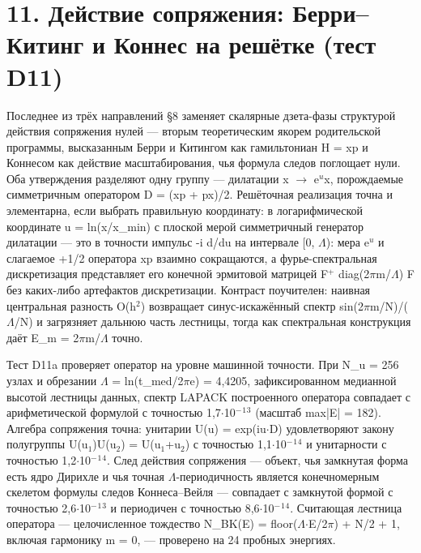 \documentclass[11pt,a4paper]{article}
\begin{document}
\section{11. Действие сопряжения: Берри--Китинг и Коннес на решётке (тест D11)}
Последнее из трёх направлений \S{}8 заменяет скалярные дзета-фазы структурой действия сопряжения нулей --- вторым теоретическим якорем родительской программы, высказанным Берри и Китингом как гамильтониан H = xp и Коннесом как действие масштабирования, чья формула следов поглощает нули. Оба утверждения разделяют одну группу --- дилатации x $\to$ e$^{u}$x, порождаемые симметричным оператором D = (xp + px)/2. Решёточная реализация точна и элементарна, если выбрать правильную координату: в логарифмической координате u = ln(x/x\_\allowbreak{}min) с плоской мерой симметричный генератор дилатации --- это в точности импульс -i d/du на интервале [0, $\Lambda$): мера e$^{u}$ и слагаемое +1/2 оператора xp взаимно сокращаются, а фурье-спектральная дискретизация представляет его конечной эрмитовой матрицей F$^{+}$ diag(2$\pi$m/$\Lambda$) F без каких-либо артефактов дискретизации. Контраст поучителен: наивная центральная разность O(h$^{2}$) возвращает синус-искажённый спектр sin(2$\pi$m/N)/($\Lambda$/N) и загрязняет дальнюю часть лестницы, тогда как спектральная конструкция даёт E\_\allowbreak{}m = 2$\pi$m/$\Lambda$ точно.

Тест D11a проверяет оператор на уровне машинной точности. При N\_\allowbreak{}u = 256 узлах и обрезании $\Lambda$ = ln(t\_\allowbreak{}med/2$\pi$e) = 4,4205, зафиксированном медианной высотой лестницы данных, спектр LAPACK построенного оператора совпадает с арифметической формулой с точностью 1,7$\cdot$10$^{-}$$^{1}$$^{3}$ (масштаб max|E| = 182). Алгебра сопряжения точна: унитарии U(u) = exp(iu$\cdot$D) удовлетворяют закону полугруппы U(u$_{1}$)U(u$_{2}$) = U(u$_{1}$+u$_{2}$) с точностью 1,1$\cdot$10$^{-}$$^{1}$$^{4}$ и унитарности с точностью 1,2$\cdot$10$^{-}$$^{1}$$^{4}$. След действия сопряжения --- объект, чья замкнутая форма есть ядро Дирихле и чья точная $\Lambda$-периодичность является конечномерным скелетом формулы следов Коннеса--Вейля --- совпадает с замкнутой формой с точностью 2,6$\cdot$10$^{-}$$^{1}$$^{3}$ и периодичен с точностью 8,6$\cdot$10$^{-}$$^{1}$$^{4}$. Считающая лестница оператора --- целочисленное тождество N\_\allowbreak{}BK(E) = floor($\Lambda$$\cdot$E/2$\pi$) + N/2 + 1, включая гармонику m = 0, --- проверено на 24 пробных энергиях.
\end{document}
